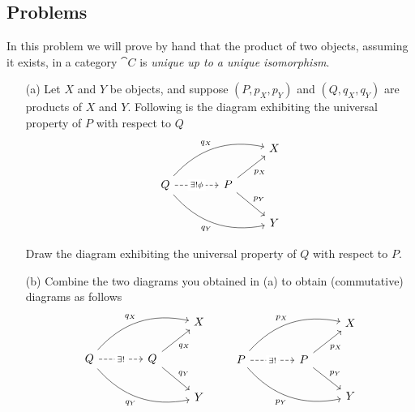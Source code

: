 
\subsection{Problems}\vspace{0.1in}

\begin{problem}\label{prob 6.1}
In this problem we will prove by hand that the product of two objects, assuming it exists, in a category $\cat{C}$ is \emph{unique up to a unique isomorphism}.
\begin{itemize}
\item[(a)] Let $X$ and $Y$ be objects, and suppose $(P,p_X,p_Y)$ and $(Q,q_X,q_Y)$ are products of $X$ and $Y$. Following is the diagram exhibiting the universal property of $P$ with respect to $Q$
\[\begin{tikzcd}
                                                                                                          &    [1.5em]                                            & X \\
Q \arrow[rru, "q_X", bend left] \arrow[rrd, "q_Y"', bend right] \arrow[r, "\exists ! \phi" description, dashed] &[1.5em] P \arrow[ru, "p_X"'] \arrow[rd, "p_Y"] &   \\
                                                                                                          & [1.5em]                                               & Y
\end{tikzcd}\]

Draw the diagram exhibiting the universal property of $Q$ with respect to $P$.

\item[(b)] Combine the two diagrams you obtained in (a) to obtain (commutative) diagrams as follows
\[\begin{tikzcd}
                                                                                                          &    [1.5em]                                            & X \\
Q \arrow[rru, "q_X", bend left] \arrow[rrd, "q_Y"', bend right] \arrow[r, "\exists !" description, dashed] &[1.5em] Q \arrow[ru, "q_X"'] \arrow[rd, "q_Y"] &   \\
                                                                                                          & [1.5em]                                               & Y
\end{tikzcd}\qquad \begin{tikzcd}
                                                                                                          &    [1.5em]                                            & X \\
P \arrow[rru, "p_X", bend left] \arrow[rrd, "p_Y"', bend right] \arrow[r, "\exists !" description, dashed] &[1.5em] P \arrow[ru, "p_X"'] \arrow[rd, "p_Y"] &   \\
                                                                                                          & [1.5em]                                               & Y
\end{tikzcd}\]


\end{itemize}
\end{problem}
